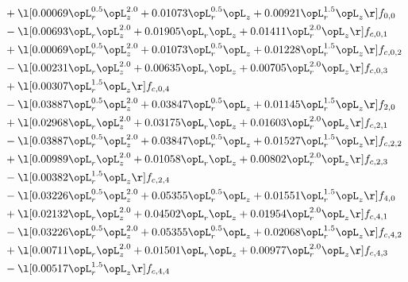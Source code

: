 \begin{alignat}{2}
& + \l[  0.00069 \opL_r^{0.5} \opL_z^{2.0} +  0.01073 \opL_r^{0.5} \opL_z +  0.00921 \opL_r^{1.5} \opL_z  \r] f_{0,0} \nonumber \\ 
& - \l[  0.00693 \opL_r \opL_z^{2.0} +  0.01905 \opL_r \opL_z +  0.01411 \opL_r^{2.0} \opL_z  \r] f_{c,0,1} \nonumber \\ 
& + \l[  0.00069 \opL_r^{0.5} \opL_z^{2.0} +  0.01073 \opL_r^{0.5} \opL_z +  0.01228 \opL_r^{1.5} \opL_z  \r] f_{c,0,2} \nonumber \\ 
& - \l[  0.00231 \opL_r \opL_z^{2.0} +  0.00635 \opL_r \opL_z +  0.00705 \opL_r^{2.0} \opL_z  \r] f_{c,0,3} \nonumber \\ 
& + \l[  0.00307 \opL_r^{1.5} \opL_z  \r] f_{c,0,4} \nonumber \\ 
& - \l[  0.03887 \opL_r^{0.5} \opL_z^{2.0} +  0.03847 \opL_r^{0.5} \opL_z +  0.01145 \opL_r^{1.5} \opL_z  \r] f_{2,0} \nonumber \\ 
& + \l[  0.02968 \opL_r \opL_z^{2.0} +  0.03175 \opL_r \opL_z +  0.01603 \opL_r^{2.0} \opL_z  \r] f_{c,2,1} \nonumber \\ 
& - \l[  0.03887 \opL_r^{0.5} \opL_z^{2.0} +  0.03847 \opL_r^{0.5} \opL_z +  0.01527 \opL_r^{1.5} \opL_z  \r] f_{c,2,2} \nonumber \\ 
& + \l[  0.00989 \opL_r \opL_z^{2.0} +  0.01058 \opL_r \opL_z +  0.00802 \opL_r^{2.0} \opL_z  \r] f_{c,2,3} \nonumber \\ 
& - \l[  0.00382 \opL_r^{1.5} \opL_z  \r] f_{c,2,4} \nonumber \\ 
& - \l[  0.03226 \opL_r^{0.5} \opL_z^{2.0} +  0.05355 \opL_r^{0.5} \opL_z +  0.01551 \opL_r^{1.5} \opL_z  \r] f_{4,0} \nonumber \\ 
& + \l[  0.02132 \opL_r \opL_z^{2.0} +  0.04502 \opL_r \opL_z +  0.01954 \opL_r^{2.0} \opL_z  \r] f_{c,4,1} \nonumber \\ 
& - \l[  0.03226 \opL_r^{0.5} \opL_z^{2.0} +  0.05355 \opL_r^{0.5} \opL_z +  0.02068 \opL_r^{1.5} \opL_z  \r] f_{c,4,2} \nonumber \\ 
& + \l[  0.00711 \opL_r \opL_z^{2.0} +  0.01501 \opL_r \opL_z +  0.00977 \opL_r^{2.0} \opL_z  \r] f_{c,4,3} \nonumber \\ 
& - \l[  0.00517 \opL_r^{1.5} \opL_z  \r] f_{c,4,4} \nonumber \\ 
\end{alignat} 


